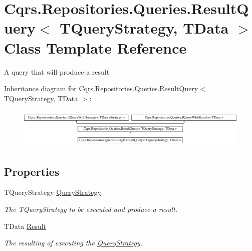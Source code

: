 \hypertarget{classCqrs_1_1Repositories_1_1Queries_1_1ResultQuery}{}\section{Cqrs.\+Repositories.\+Queries.\+Result\+Query$<$ T\+Query\+Strategy, T\+Data $>$ Class Template Reference}
\label{classCqrs_1_1Repositories_1_1Queries_1_1ResultQuery}


A query that will produce a result  


Inheritance diagram for Cqrs.\+Repositories.\+Queries.\+Result\+Query$<$ T\+Query\+Strategy, T\+Data $>$\+:\begin{figure}[H]
\begin{center}
\leavevmode
\includegraphics[height=1.939954cm]{classCqrs_1_1Repositories_1_1Queries_1_1ResultQuery}
\end{center}
\end{figure}
\subsection*{Properties}
\begin{DoxyCompactItemize}
\item 
T\+Query\+Strategy \hyperlink{classCqrs_1_1Repositories_1_1Queries_1_1ResultQuery_abad7775345c741c688bab2ec4671ba6b_abad7775345c741c688bab2ec4671ba6b}{Query\+Strategy}
\begin{DoxyCompactList}\small\item\em The {\itshape T\+Query\+Strategy}  to be executed and produce a result. \end{DoxyCompactList}\item 
T\+Data \hyperlink{classCqrs_1_1Repositories_1_1Queries_1_1ResultQuery_a1c9b0137e4b5b1c00c6198fdcfde7ca3_a1c9b0137e4b5b1c00c6198fdcfde7ca3}{Result}
\begin{DoxyCompactList}\small\item\em The resulting of executing the \hyperlink{classCqrs_1_1Repositories_1_1Queries_1_1QueryStrategy}{Query\+Strategy}. \end{DoxyCompactList}\end{DoxyCompactItemize}


